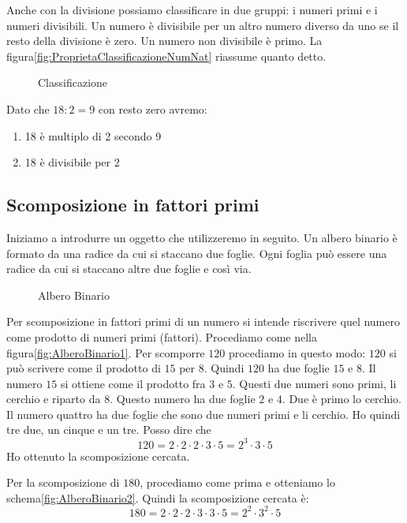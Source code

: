 Anche con la divisione possiamo classificare in due gruppi: i numeri primi e i numeri divisibili. Un numero è divisibile per un altro numero diverso da uno se il resto della divisione è zero. Un numero non divisibile è primo. La figura\nobs\vref{fig:ProprietaClassificazioneNumNat} riassume quanto detto.
\begin{figure} %
	\centering

	\caption{Classificazione}
	\label{fig:ProprietaClassificazioneNumNat}
\end{figure}
	\begin{esempio}
Dato che $18:2=9$ con resto zero avremo:
\begin{enumerate}
	\item 18 è multiplo di 2 secondo 9
	\item 18 è divisibile per 2
\end{enumerate}
	\end{esempio}
\subsection{Scomposizione in fattori primi}
Iniziamo a introdurre un oggetto che utilizzeremo in seguito. Un albero binario è formato da una radice da cui si staccano due foglie. Ogni foglia può essere una radice da cui si staccano altre due foglie e così via. 
\begin{figure} %
	\centering

	\caption{Albero Binario}
	\label{fig:AlberoBinarioDef}
\end{figure}

Per scomposizione in fattori primi  di un numero si intende riscrivere quel numero come prodotto di numeri primi (fattori). Procediamo come nella figura\nobs\vref{fig:AlberoBinario1}. Per scomporre $120$ procediamo in questo modo: $120$ si può scrivere come il prodotto di $15$ per $8$. Quindi $120$ ha due foglie $15$ e $8$. Il numero  $15$ si ottiene come il prodotto fra $3$ e $5$. Questi due numeri sono primi, li cerchio e riparto da $8$. Questo numero ha due foglie $2$ e $4$. Due è primo lo cerchio. Il numero quattro ha due foglie che sono due numeri primi e li cerchio. Ho quindi tre due, un cinque e un tre. Posso dire che \[120=2\cdot 2\cdot 2 \cdot 3 \cdot5 =2^3\cdot 3\cdot 5   \]Ho ottenuto la scomposizione cercata.

Per la scomposizione di $180$, procediamo come prima e otteniamo lo schema\nobs\vref{fig:AlberoBinario2}. Quindi la scomposizione cercata è:
\[180=2\cdot 2\cdot 2\cdot 3\cdot 3\cdot 5=2^2\cdot 3^2\cdot 5 \]    

